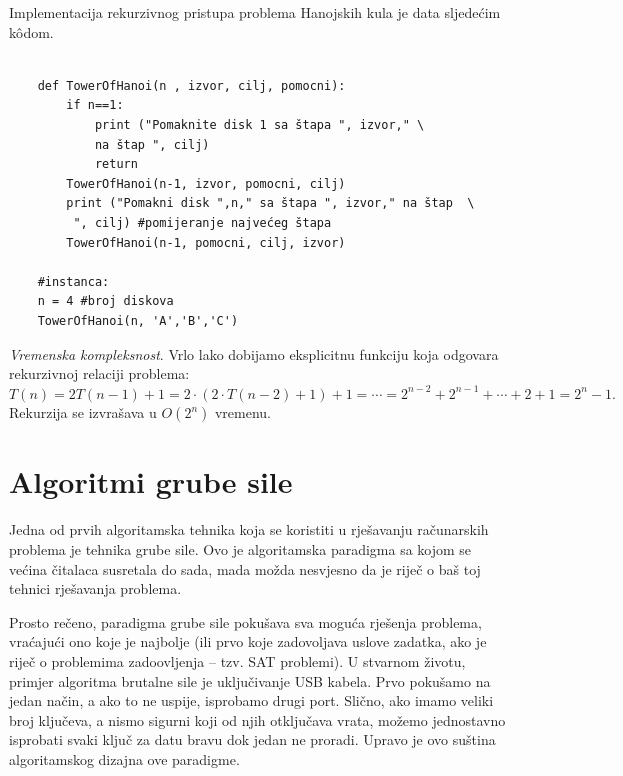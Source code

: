 \begin{solution}
Implementacija rekurzivnog pristupa problema Hanojskih kula je data sljedećim k\^odom. 

\begin{verbatim}
	 
	def TowerOfHanoi(n , izvor, cilj, pomocni):
	    if n==1:
	        print ("Pomaknite disk 1 sa štapa ", izvor," \ 
	        na štap ", cilj)
	        return
	    TowerOfHanoi(n-1, izvor, pomocni, cilj)
	    print ("Pomakni disk ",n," sa štapa ", izvor," na štap  \ 
	     ", cilj) #pomijeranje najvećeg štapa
	    TowerOfHanoi(n-1, pomocni, cilj, izvor)
	
	#instanca:
	n = 4 #broj diskova
	TowerOfHanoi(n, 'A','B','C')
\end{verbatim} 

\textit{Vremenska kompleksnost}. Vrlo lako dobijamo eksplicitnu funkciju koja odgovara   rekurzivnoj relaciji problema: $T(n)= 2  T(n-1) + 1 = 2 \cdot ( 2 \cdot T(n-2) + 1) + 1 = \cdots = 2^{n-2} + 2^{n-1} + \cdots + 2 + 1 = 2^n -1.$
Rekurzija se izvrašava u $O(2^n)$ vremenu.  %


\end{solution}	
 

\section{Algoritmi grube sile}



Jedna od prvih algoritamska tehnika koja se koristiti u rješavanju  računarskih problema je tehnika grube sile. Ovo je algoritamska paradigma sa kojom se većina čitalaca susretala do sada, mada možda nesvjesno da je riječ o baš toj tehnici rješavanja problema.

Prosto rečeno, paradigma grube sile pokušava sva moguća rješenja problema, vraćajući ono koje je najbolje (ili prvo koje zadovoljava uslove zadatka, ako je riječ o problemima zadoovljenja -- tzv. SAT problemi). U stvarnom životu,  primjer algoritma brutalne sile je uključivanje USB kabela. Prvo pokušamo  na jedan način, a ako to ne uspije, isprobamo drugi port.  Slično, ako imamo veliki broj ključeva, a nismo sigurni koji od njih otključava vrata, možemo jednostavno isprobati svaki ključ za datu bravu dok jedan ne proradi. Upravo je ovo suština algoritamskog dizajna ove paradigme.

